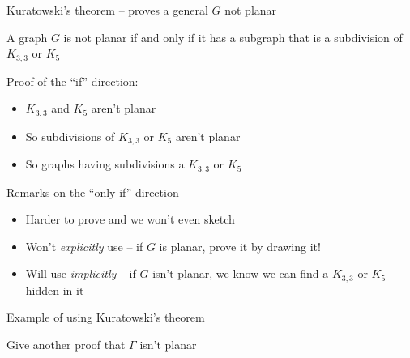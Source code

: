 \documentclass{beamer}
\begin{document}
\begin{frame}{Kuratowski's theorem -- proves a general $G$ not planar}
\begin{theorem} A graph $G$ is not planar if and only if it has a subgraph that is a subdivision of $K_{3,3}$ or $K_5$    
    \end{theorem}

\begin{block}{Proof of the ``if'' direction:}
\begin{itemize}
    \item $K_{3,3}$ and $K_5$ aren't planar
    \item So subdivisions of $K_{3,3}$ or $K_5$ aren't planar
    \item So graphs having subdivisions a $K_{3,3}$ or $K_5$
\end{itemize}
\end{block}
\begin{block}{Remarks on the ``only if'' direction}
  \begin{itemize}
  \item Harder to prove and we won't even sketch
  \item Won't \emph{explicitly} use -- if $G$ is planar, prove it by drawing it!
  \item Will use \emph{implicitly} -- if $G$ isn't planar, we know we can find a $K_{3,3}$ or $K_5$ hidden in it
    \end{itemize}
\end{block}


    
\end{frame}

\begin{frame}{Example of using Kuratowski's theorem}

  \begin{center}
\end{center}
  \begin{block}{Give another proof that $\Gamma$ isn't planar}

    \end{block}


  \end{frame}
\end{document}
